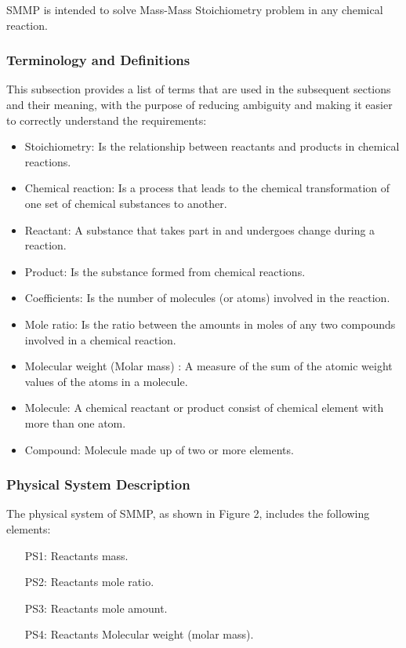 \documentclass[12pt]{article}
\begin{document}
SMMP is intended to solve  Mass-Mass Stoichiometry problem in any chemical reaction. 

\subsubsection{Terminology and  Definitions}



This subsection provides a list of terms that are used in the subsequent
sections and their meaning, with the purpose of reducing ambiguity and making it
easier to correctly understand the requirements:

\begin{itemize}

\item Stoichiometry:  Is the relationship between reactants and products in chemical reactions.
\item Chemical reaction: Is a process that leads to the chemical transformation of one set of chemical substances to another.
\item Reactant: A substance that takes part in and undergoes change during a reaction.
\item Product:  Is the substance formed from chemical reactions.
\item Coefficients: Is the number of molecules (or atoms) involved in the reaction.
\item Mole ratio:  Is ​the ratio between the amounts in moles of any two compounds involved in a chemical reaction.
\item Molecular weight (Molar mass) :  A measure of the sum of the atomic weight values of the atoms in a molecule. 
\item Molecule: A chemical reactant or product consist of chemical element with more than one atom.
\item Compound: Molecule made up of two or more elements.
\end{itemize}

\subsubsection{Physical System Description} \label{sec_phySystDescrip}

The physical system of SMMP, as shown in Figure 2,
includes the following elements:

\begin{itemize}

\item[PS1:] Reactants mass.\\
\item[PS2:] Reactants mole ratio.\\
\item[PS3:] Reactants mole amount.\\
\item[PS4:] Reactants Molecular weight (molar mass).\\

\end{itemize}
\end{document}

